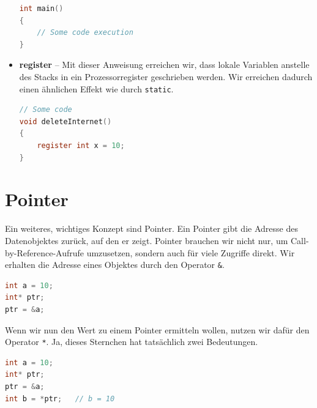\documentclass[11pt,a4paper]{scrartcl}
\begin{document}
\begin{itemize}
\begin{lstlisting}[language=C]
int main() 
{
	// Some code execution
}
\end{lstlisting}
\item \textbf{register} -- Mit dieser Anweisung erreichen wir, dass lokale Variablen anstelle des Stacks in ein Prozessorregister geschrieben werden. Wir erreichen dadurch einen ähnlichen Effekt wie durch \texttt{static}.
\begin{lstlisting}[language=C]
// Some code
void deleteInternet() 
{
	register int x = 10;
}
\end{lstlisting}
\end{itemize}
\section{Pointer}
Ein weiteres, wichtiges Konzept sind Pointer. Ein Pointer gibt die Adresse des Datenobjektes zurück, auf den er zeigt. Pointer brauchen wir nicht nur, um Call-by-Reference-Aufrufe umzusetzen, sondern auch für viele Zugriffe direkt.
Wir erhalten die Adresse eines Objektes durch den Operator \texttt{\&}.
\begin{lstlisting}[language=C]
int a = 10;
int* ptr;
ptr = &a;
\end{lstlisting}
Wenn wir nun den Wert zu einem Pointer ermitteln wollen, nutzen wir dafür den Operator \texttt{*}. Ja, dieses Sternchen hat tatsächlich zwei Bedeutungen.
\begin{lstlisting}[language=C]
int a = 10;
int* ptr;
ptr = &a;
int b = *ptr; 	// b = 10
\end{lstlisting}
\end{document}

